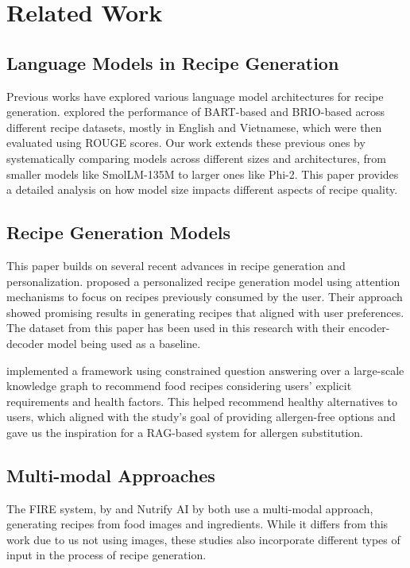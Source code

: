 \section{Related Work}
\subsection{Language Models in Recipe Generation}
Previous works have explored various language model architectures for recipe generation. \citet{lam2024enhancing} explored the performance of BART-based \citep{lewis-etal-2020-bart} and BRIO-based \citep{liu-etal-2022-brio} across different recipe datasets, mostly in English and Vietnamese, which were then evaluated using ROUGE scores. Our work extends these previous ones by systematically comparing models across different sizes and architectures, from smaller models like SmolLM-135M to larger ones like Phi-2. This paper provides a detailed analysis on how model size impacts different aspects of recipe quality. 

\subsection{Recipe Generation Models}
This paper builds on several recent advances in recipe generation and personalization. \citet{majumder2019generatingpersonalizedrecipeshistorical} proposed a personalized recipe generation model using attention mechanisms to focus on recipes previously consumed by the user. Their approach showed promising results in generating recipes that aligned with user preferences. The dataset from this paper has been used in this research with their encoder-decoder model being used as a baseline.

\citet{Chen_2021} implemented a framework using constrained question answering over a large-scale knowledge graph to recommend food recipes considering users' explicit requirements and health factors. This helped recommend healthy alternatives to users, which aligned with the study's goal of providing allergen-free options and gave us the inspiration for a RAG-based system for allergen substitution. 

\subsection{Multi-modal Approaches}
The FIRE system, by \citet{chhikara2024firefoodimagerecipe} and Nutrify AI by \citet{han2024nutrifyaiaipoweredrealtimefood} both use a multi-modal approach, generating recipes from food images and ingredients. While it differs from this work due to us not using images, these studies also incorporate different types of input in the process of recipe generation.

